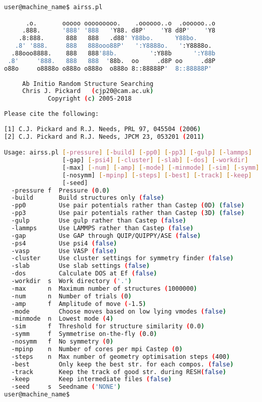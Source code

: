 \documentclass[a4paper, 10pt]{article}
\begin{document}
\begin{lstlisting}[language={bash}]
user@machine_name$ airss.pl

      .o.       ooooo ooooooooo.    .oooooo..o  .oooooo..o 
     .888.      '888' '888   'Y88. d8P'    'Y8 d8P'    'Y8 
    .8:888.      888   888   .d88' Y88bo.      Y88bo.      
   .8' '888.     888   888ooo88P'   ':Y8888o.   ':Y8888o.  
  .88ooo8888.    888   888'88b.         ':Y88b      ':Y88b 
 .8'     '888.   888   888  '88b.  oo     .d8P oo     .d8P 
o88o     o8888o o888o o888o  o888o 8::88888P'  8::88888P'  
                                                      
     Ab Initio Random Structure Searching             
     Chris J. Pickard   (cjp20@cam.ac.uk)            
            Copyright (c) 2005-2018                   
                                                      
Please cite the following:                                 
                                                      
[1] C.J. Pickard and R.J. Needs, PRL 97, 045504 (2006)     
[2] C.J. Pickard and R.J. Needs, JPCM 23, 053201 (2011)    

Usage: airss.pl [-pressure] [-build] [-pp0] [-pp3] [-gulp] [-lammps] 
                [-gap] [-psi4] [-cluster] [-slab] [-dos] [-workdir] 
                [-max] [-num] [-amp] [-mode] [-minmode] [-sim] [-symm]
                [-nosymm] [-mpinp] [-steps] [-best] [-track] [-keep] 
                [-seed]
  -pressure f  Pressure (0.0)
  -build       Build structures only (false)
  -pp0         Use pair potentials rather than Castep (0D) (false)
  -pp3         Use pair potentials rather than Castep (3D) (false)
  -gulp        Use gulp rather than Castep (false)
  -lammps      Use LAMMPS rather than Castep (false)
  -gap         Use GAP through QUIP/QUIPPY/ASE (false)
  -ps4         Use psi4 (false)
  -vasp        Use VASP (false)
  -cluster     Use cluster settings for symmetry finder (false)
  -slab        Use slab settings (false)
  -dos         Calculate DOS at Ef (false)
  -workdir  s  Work directory ('.')
  -max      n  Maximum number of structures (1000000)
  -num      n  Number of trials (0)
  -amp      f  Amplitude of move (-1.5)
  -mode        Choose moves based on low lying vmodes (false)
  -minmode  n  Lowest mode (4)
  -sim      f  Threshold for structure similarity (0.0)
  -symm     f  Symmetrise on-the-fly (0.0)
  -nosymm   f  No symmetry (0)
  -mpinp    n  Number of cores per mpi Castep (0)
  -steps    n  Max number of geometry optimisation steps (400)
  -best        Only keep the best str. for each compos. (false)
  -track       Keep the track of good str. during RESH(false)
  -keep        Keep intermediate files (false)
  -seed     s  Seedname ('NONE')
user@machine_name$
\end{lstlisting}
\end{document}
